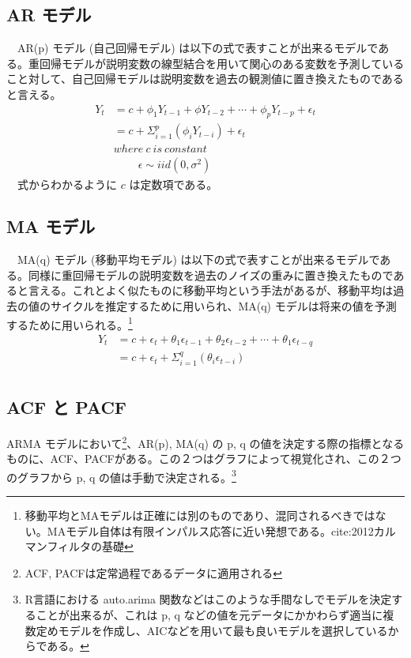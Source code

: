 \documentclass[dvipdfmx]{scrartcl}
\begin{document}
\subsection{AR モデル}
\label{sec:orgdc1a233}
　AR(p) モデル (自己回帰モデル) は以下の式で表すことが出来るモデルである。重回帰モデルが説明変数の線型結合を用いて関心のある変数を予測していること対して、自己回帰モデルは説明変数を過去の観測値に置き換えたものであると言える。\\
\begin{align}
Y_t &= c + \phi_1  Y_{t-1} +\phi Y_{t-2} + \cdots + \phi_p  Y_{t-p} + \epsilon_t \nonumber \\
&= c + \Sigma_{i=1}^{p} (\phi_i  Y_{t-i}) +\epsilon_t  \nonumber \\
&where \  c \ is\  constant \ \nonumber \\ 
&\ \ \ \ \ \ \ \ \ \ \epsilon \sim iid(0, \sigma^2)
\end{align}
　式からわかるように \(c\) は定数項である。\\
\subsection{MA モデル}
\label{sec:orgd2901d8}
　MA(q) モデル (移動平均モデル) は以下の式で表すことが出来るモデルである。同様に重回帰モデルの説明変数を過去のノイズの重みに置き換えたものであると言える。これとよく似たものに移動平均という手法があるが、移動平均は過去の値のサイクルを推定するために用いられ、MA(q) モデルは将来の値を予測するために用いられる。\footnote{移動平均とMAモデルは正確には別のものであり、混同されるべきではない。MAモデル自体は有限インパルス応答に近い発想である。cite:2012カルマンフィルタの基礎}\\

\begin{align}
Y_t &= c + \epsilon_t + \theta_1 \epsilon_{t-1} + \theta_2 \epsilon_{t-2} + \cdots + \theta_1 \epsilon_{t-q}   \nonumber \\
&= c + \epsilon_t + \Sigma_{i=1}^{q} (\theta_i \epsilon_{t-i})  \nonumber \\
\end{align}
\subsection{ACF と PACF}
\label{sec:org946c9ae}
ARMA モデルにおいて\footnote{ACF, PACFは定常過程であるデータに適用される}、AR(p), MA(q) の p, q の値を決定する際の指標となるものに、ACF、PACFがある。この２つはグラフによって視覚化され、この２つのグラフから p, q の値は手動で決定される。\footnote{R言語における auto.arima 関数などはこのような手間なしでモデルを決定することが出来るが、これは p, q などの値を元データにかかわらず適当に複数定めモデルを作成し、AICなどを用いて最も良いモデルを選択しているからである。} \cite{stat510}
\end{document}
